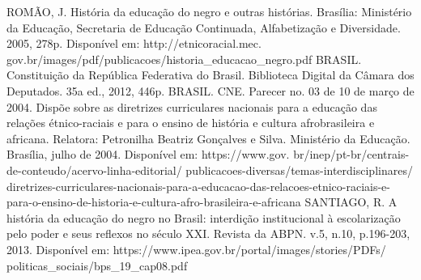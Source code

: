 {ROMÃO, J. História da educação do negro e outras histórias. Brasília: Ministério da Educação, Secretaria de Educação Continuada, Alfabetização
e Diversidade. 2005, 278p. Disponível em: http://etnicoracial.mec.
gov.br/images/pdf/publicacoes/historia\_educacao\_negro.pdf
\newline \newline 
BRASIL. Constituição da República Federativa do Brasil. Biblioteca Digital da Câmara dos Deputados. 35a ed., 2012, 446p.
\newline \newline 
BRASIL. CNE. Parecer no. 03 de 10 de março de 2004. Dispõe sobre as diretrizes curriculares nacionais para a educação das relações
étnico-raciais e para o ensino de história e cultura afrobrasileira e africana. Relatora: Petronilha Beatriz Gonçalves e Silva. Ministério da
Educação. Brasília, julho de 2004. Disponível em: https://www.gov.
br/inep/pt-br/centrais-de-conteudo/acervo-linha-editorial/
publicacoes-diversas/temas-interdisciplinares/
diretrizes-curriculares-nacionais-para-a-educacao-das-relacoes-etnico-raciais-e-para-o-ensino-de-historia-e-cultura-afro-brasileira-e-africana
\newline \newline 
SANTIAGO, R. A história da educação do negro no Brasil: interdição institucional à escolarização pelo poder e seus reflexos no século XXI. Revista da ABPN. v.5, n.10, p.196-203, 2013. Disponível em: https://www.ipea.gov.br/portal/images/stories/PDFs/
politicas\_sociais/bps\_19\_cap08.pdf
}



